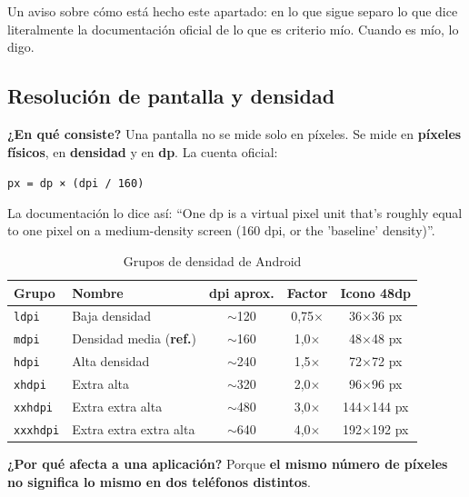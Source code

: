 \documentclass[11pt,a4paper]{article}
\newcommand{\code}[1]{\texttt{\color{ink}#1}}
\newcommand{\campo}[1]{\textbf{\color{ink}#1}}
\begin{document}
	Un aviso sobre cómo está hecho este apartado: en lo que sigue separo lo que dice literalmente la documentación oficial de lo que es criterio mío. Cuando es mío, lo digo.
	
	\subsection{Resolución de pantalla y densidad}
	
	\campo{¿En qué consiste?}
	Una pantalla no se mide solo en píxeles. Se mide en \textbf{píxeles físicos}, en \textbf{densidad} y en \textbf{dp}. La cuenta oficial:
	\begin{center}\code{px = dp × (dpi / 160)}\end{center}
	La documentación lo dice así: \enquote{One dp is a virtual pixel unit that's roughly equal to one pixel on a medium-density screen (160 dpi, or the 'baseline' density)}.
	
	\begin{table}[htbp]
		\centering
		\small
		\begin{tabular}{@{}l l c c c@{}}
			\toprule
			\rowcolor{primary}
			\textcolor{paper}{\sffamily\bfseries Grupo} & \textcolor{paper}{\sffamily\bfseries Nombre} & \textcolor{paper}{\sffamily\bfseries dpi aprox.} & \textcolor{paper}{\sffamily\bfseries Factor} & \textcolor{paper}{\sffamily\bfseries Icono 48dp} \\
			\midrule
			\code{ldpi} & Baja densidad & $\sim$120 & 0,75$\times$ & 36$\times$36 px \\
			\rowcolor{soft}
			\code{mdpi} & Densidad media (\textbf{ref.}) & $\sim$160 & 1,0$\times$ & 48$\times$48 px \\
			\code{hdpi} & Alta densidad & $\sim$240 & 1,5$\times$ & 72$\times$72 px \\
			\rowcolor{soft}
			\code{xhdpi} & Extra alta & $\sim$320 & 2,0$\times$ & 96$\times$96 px \\
			\code{xxhdpi} & Extra extra alta & $\sim$480 & 3,0$\times$ & 144$\times$144 px \\
			\rowcolor{soft}
			\code{xxxhdpi} & Extra extra extra alta & $\sim$640 & 4,0$\times$ & 192$\times$192 px \\
			\bottomrule
		\end{tabular}
		\caption{Grupos de densidad de Android}
	\end{table}
	
	\campo{¿Por qué afecta a una aplicación?}
	Porque \textbf{el mismo número de píxeles no significa lo mismo en dos teléfonos distintos}.
	
\end{document}
